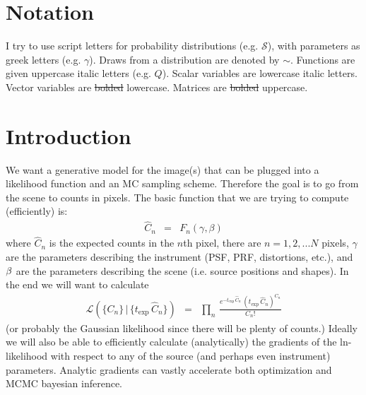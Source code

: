 \documentclass[modern]{aastex6}
\newcommand{\given}{\,|\,}
\newcommand{\counts}{C}
\newcommand{\countrate}{\hat{C}}
\newcommand{\exptime}{t_{\mathrm{exp}}}
\newcommand{\qe}{Q}
\newcommand{\scene}{\mathcal{S}}
\newcommand{\like}{\mathcal{L}}
\begin{document}
\author{Image Forward Modeling Techniques}


\section{Notation}
I try to use script letters for probability distributions (e.g. $\scene$), with parameters as greek letters (e.g. $\gamma$).
Draws from a distribution are denoted by $\sim$.
Functions are given uppercase italic letters (e.g. $\qe$).
Scalar variables are lowercase italic letters.
Vector variables are \sout{bolded} lowercase.
Matrices are \sout{bolded} uppercase.

\section{Introduction}
We want a generative model for the image(s) that can be plugged into a likelihood function and an MC sampling scheme.
Therefore the goal is to go from the scene to counts in pixels.
The basic function that we are trying to compute (efficiently) is:
\begin{eqnarray}
\countrate_n & = & F_n(\gamma, \beta)
\end{eqnarray}
where $\countrate_n$ is the expected counts in the $n$th pixel,
there are $n=1,2,...N$ pixels,
$\gamma$ are the parameters describing the instrument (PSF, PRF, distortions, etc.),
and ${\bf \beta}$ are the parameters describing the scene (i.e. source positions and shapes).
In the end we will want to calculate
\begin{eqnarray}
\like(\{\counts_n\} \given \{\exptime \, \countrate_n\}) & = & \prod_n \, \frac{e^{-\exptime \, \countrate_n} \, (\exptime \, \countrate_n)^{\counts_n}} {\counts_n !}
\end{eqnarray}
(or probably the Gaussian likelihood since there will be plenty of counts.)
Ideally we will also be able to efficiently calculate (analytically) the gradients of the ln-likelihood with respect to any of the source (and perhaps even instrument) parameters.
Analytic gradients can vastly accelerate both optimization and MCMC bayesian inference.
\end{document}
